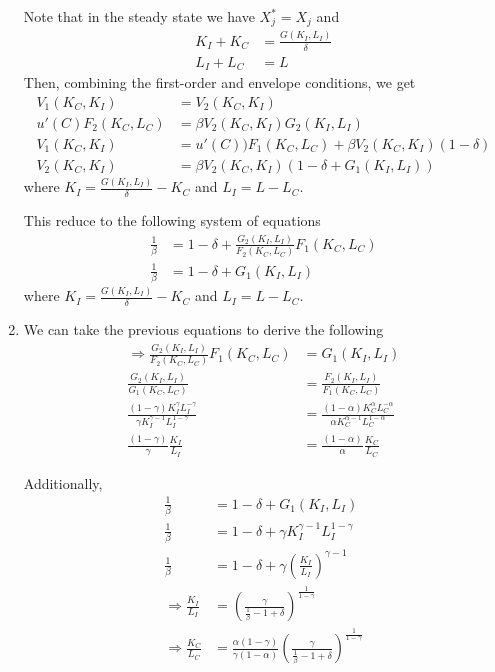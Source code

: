\documentclass[12pt]{article}
\theoremstyle{definition}
\begin{document}
\begin{enumerate}[1.]
	Note that in the steady state we have $X_j^*=X_j$ and
	\begin{align*}
		K_I+K_C&=\frac{G(K_I,L_I)}{\delta} \\
		L_I+L_C &=L
	\end{align*}
	Then, combining the first-order and envelope conditions, we get
	\begin{align*}
		V_1(K_C,K_I) & = V_2(K_C,K_I) \\
		u'(C) F_2(K_{C},L_{C}) &= \beta V_2(K_{C},K_{I}) G_2(K_{I}, L_{I})\\
		V_1(K_{C},K_{I})	&= u'({C})) F_1(K_{C},L_{C})	+ \beta V_2(K_{C},K_{I})(1-\delta)\\
		V_2(K_{C},K_{I})	& = \beta V_2(K_{C},K_{I})(1-\delta + G_1(K_{I}, L_{I}))
	\end{align*}
	where $K_I =\frac{G(K_I,L_I)}{\delta} -K_C$ and $L_I = L - L_C$.
	
	This reduce to the following system of equations
	\begin{align*}
	\frac{1}{\beta}	&= 1-\delta +\frac{ G_2(K_{I}, L_{I})}{F_2(K_{C},L_{C})} F_1(K_{C},L_{C})	\\
	\frac{1}{\beta}	& = 1-\delta + G_1(K_{I}, L_{I})
	\end{align*}
	where $K_I =\frac{G(K_I,L_I)}{\delta} -K_C$ and $L_I = L - L_C$.
	\item 
	
	We can take the previous equations to derive the following
	\begin{align*}
	\Rightarrow \frac{ G_2(K_{I}, L_{I})}{F_2(K_{C},L_{C})} F_1(K_{C},L_{C}) & = G_1(K_{I}, L_{I})\\
	\frac{ G_2(K_{I}, L_{I})}{G_1(K_{C},L_{C})}& = \frac{ F_2(K_{I}, L_{I})}{F_1(K_{C},L_{C})}\\
	\frac{ (1-\gamma)K_{I}^{\gamma}L_{I}^{-\gamma} }{ \gamma K_{I}^{\gamma-1}L_{I}^{1-\gamma} }& = \frac{ (1-\alpha)K_{C}^{\alpha}L_{C}^{-\alpha} }{ \alpha K_{C}^{\alpha-1}L_{C}^{1-\alpha} }\\
	\frac{(1-\gamma)}{\gamma}\frac{ K_{I}}{L_{I}}& = \frac{(1-\alpha)}{\alpha}\frac{ K_{C}}{L_{C}}
	\end{align*}
	
	Additionally,
		\begin{align*}
	\frac{1}{\beta}	& = 1-\delta + G_1(K_{I}, L_{I}) \\
	\frac{1}{\beta}	& = 1-\delta + \gamma K_{I}^{\gamma-1}L_{I}^{1-\gamma} \\
	\frac{1}{\beta}	& = 1-\delta + \gamma \left( \frac{K_{I}}{L_{I}}\right) ^{\gamma-1} \\
	\Rightarrow \frac{K_{I}}{L_{I}} & =\left(\frac{\gamma}{\frac{1}{\beta}-1+\delta} \right)^{\frac{1}{1-\gamma}}\\
	\Rightarrow \frac{K_{C}}{L_{C}} & =\frac{\alpha(1-\gamma)}{\gamma(1-\alpha)} \left(\frac{\gamma}{\frac{1}{\beta}-1+\delta} \right)^{\frac{1}{1-\gamma}}
	\end{align*}
	

\end{enumerate}
\end{document}
